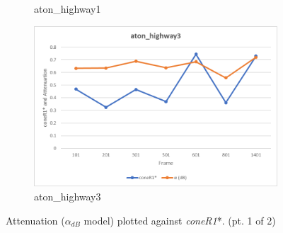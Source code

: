 \begin{appendices}
\begin{figure}
\begin{subfigure}{.45\linewidth}
  \caption{aton\_highway1}
\end{subfigure}
\hfill
\begin{subfigure}{.45\linewidth}
  \includegraphics[width=1\linewidth]{figures/appendix/highway3_db.jpg}
  \caption{aton\_highway3}
\end{subfigure}
\caption{Attenuation ($\alpha_{dB}$ model) plotted against \textit{coneR1}*. (pt. 1 of 2)}

\end{figure}

\begin{figure}


\end{figure}
\end{appendices}
